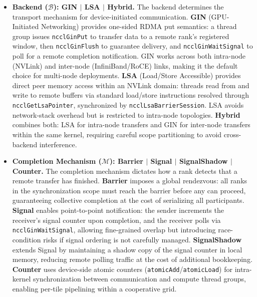 \begin{itemize}[leftmargin=1.4em,itemsep=2pt,topsep=2pt]

\item \textbf{Backend ($\mathcal{B}$): GIN $|$ LSA $|$ Hybrid.}
The backend determines the transport mechanism for device-initiated communication. \textbf{GIN} (GPU-Initiated Networking) provides one-sided RDMA put semantics: a thread group issues \texttt{ncclGinPut} to transfer data to a remote rank's registered window, then \texttt{ncclGinFlush} to guarantee delivery, and \texttt{ncclGinWaitSignal} to poll for a remote completion notification. GIN works across both intra-node (NVLink) and inter-node (InfiniBand/RoCE) links, making it the default choice for multi-node deployments. \textbf{LSA} (Load/Store Accessible) provides direct peer memory access within an NVLink domain: threads read from and write to remote buffers via standard load/store instructions resolved through \texttt{ncclGetLsaPointer}, synchronized by \texttt{ncclLsaBarrierSession}. LSA avoids network-stack overhead but is restricted to intra-node topologies. \textbf{Hybrid} combines both: LSA for intra-node transfers and GIN for inter-node transfers within the same kernel, requiring careful scope partitioning to avoid cross-backend interference.

\item \textbf{Completion Mechanism ($\mathcal{M}$): Barrier $|$ Signal $|$ SignalShadow $|$ Counter.}
The completion mechanism dictates how a rank detects that a remote transfer has finished. \textbf{Barrier} imposes a global rendezvous: all ranks in the synchronization scope must reach the barrier before any can proceed, guaranteeing collective completion at the cost of serializing all participants. \textbf{Signal} enables point-to-point notification: the sender increments the receiver's signal counter upon completion, and the receiver polls via \texttt{ncclGinWaitSignal}, allowing fine-grained overlap but introducing race-condition risks if signal ordering is not carefully managed. \textbf{SignalShadow} extends Signal by maintaining a shadow copy of the signal counter in local memory, reducing remote polling traffic at the cost of additional bookkeeping. \textbf{Counter} uses device-side atomic counters (\texttt{atomicAdd}/\texttt{atomicLoad}) for intra-kernel synchronization between communication and compute thread groups, enabling per-tile pipelining within a cooperative grid.


\end{itemize}

